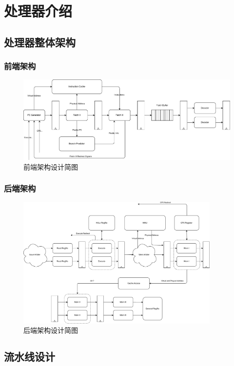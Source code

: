 \documentclass{beamer}
\begin{document}
\section{处理器介绍}

\subsection{处理器整体架构}

\begin{frame}
    \frametitle{前端架构}

    \begin{figure}
        \centering
        \includegraphics[width=\textwidth]{pic/front-end.pdf}
        \caption{前端架构设计简图}
    \end{figure}
\end{frame}

\begin{frame}
    \frametitle{后端架构}
    \begin{figure}
        \centering
        \includegraphics[width=0.9\textwidth]{pic/back-end.pdf}
        \caption{后端架构设计简图}
    \end{figure}
\end{frame}


\subsection{流水线设计}
\end{document}

